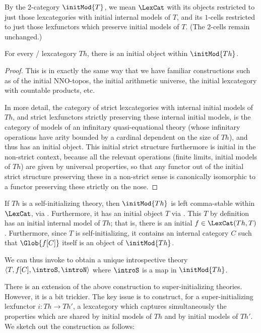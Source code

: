 By the 2-category $\initMod{T}$, we mean $\LexCat$ with its objects restricted to just those lexcategories with initial internal models of $T$, and its $1$-cells restricted to just those lexfunctors which preserve initial models of $T$. (The $2$-cells remain unchanged.)

\begin{theorem}\label{InitialModelWithInitialModel}
For every \setsmall/ lexcategory $Th$, there is an initial object within $\initMod{Th}$.
\end{theorem}
\begin{proof}
This is in exactly the same way that we have familiar constructions such as of the initial NNO-topos, the initial arithmetic universe, the initial lexcategory with countable products, etc.

In more detail, the category of strict lexcategories with internal initial models of $Th$, and strict lexfunctors strictly preserving these internal initial models, is the category of models of an infinitary quasi-equational theory (whose infinitary operations have arity bounded by a cardinal dependent on the size of $Th$), and thus has an initial object. This initial strict structure furthermore is initial in the non-strict context, because all the relevant operations (finite limits, initial models of $Th$) are given by universal properties, so that any functor out of the initial strict structure preserving these in a non-strict sense is canonically isomorphic to a functor preserving these strictly on the nose.
\end{proof}

\begin{construction}
If $Th$ is a self-initializing theory, then $\initMod{Th}$ is left comma-stable within $\LexCat$, via . Furthermore, it has an initial object $T$ via . This $T$ by definition has an initial internal model of $Th$; that is, there is an initial $f \in \LexCat(Th, T)$. Furthermore, since $T$ is self-initializing, it contains an internal category $C$ such that $\Glob{f[C]}$ itself is an object of $\initMod{Th}$.

We can thus invoke  to obtain a unique introspective theory $\langle T, f[C], \introS, \introN \rangle$ where $\introS$ is a map in $\initMod{Th}$.
\end{construction}

There is an extension of the above construction to super-initializing theories. However, it is a bit trickier. The key issue is to construct, for a super-initializing lexfunctor $i : Th \to Th'$, a lexcategory which captures simultaneously the properties which are shared by initial models of $Th$ and by initial models of $Th'$. We sketch out the construction as follows:

